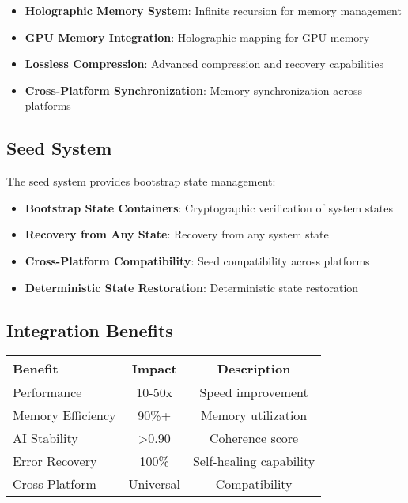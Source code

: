 \documentclass[12pt,a4paper]{article}
\begin{document}
\begin{itemize}
    \item \textbf{Holographic Memory System}: Infinite recursion for memory management
    \item \textbf{GPU Memory Integration}: Holographic mapping for GPU memory
    \item \textbf{Lossless Compression}: Advanced compression and recovery capabilities
    \item \textbf{Cross-Platform Synchronization}: Memory synchronization across platforms
\end{itemize}

\subsection{Seed System}
The seed system provides bootstrap state management:

\begin{itemize}
    \item \textbf{Bootstrap State Containers}: Cryptographic verification of system states
    \item \textbf{Recovery from Any State}: Recovery from any system state
    \item \textbf{Cross-Platform Compatibility}: Seed compatibility across platforms
    \item \textbf{Deterministic State Restoration}: Deterministic state restoration
\end{itemize}

\subsection{Integration Benefits}
\begin{center}
\begin{tabular}{|l|c|c|}
\hline
\textbf{Benefit} & \textbf{Impact} & \textbf{Description} \\
\hline
Performance & 10-50x & Speed improvement \\
Memory Efficiency & 90\%+ & Memory utilization \\
AI Stability & >0.90 & Coherence score \\
Error Recovery & 100\% & Self-healing capability \\
Cross-Platform & Universal & Compatibility \\
\hline
\end{tabular}
\end{center}

\newpage
\end{document}
